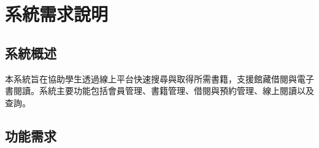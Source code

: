 \chapter{系統需求說明}

\section{系統概述}

\hspace*{2em}本系統旨在協助學生透過線上平台快速搜尋與取得所需書籍，支援館藏借閱與電子書閱讀。系統主要功能包括會員管理、書籍管理、借閱與預約管理、線上閱讀以及查詢。

\section{功能需求}

